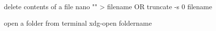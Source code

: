 delete contents of a file
nano "" > filename OR truncate -s 0 filename 

open a folder from terminal
xdg-open foldername
